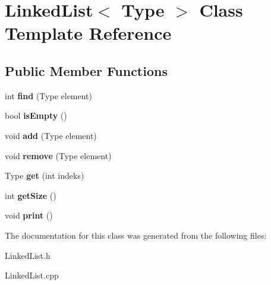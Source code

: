 \hypertarget{classLinkedList}{}\section{Linked\+List$<$ Type $>$ Class Template Reference}
\label{classLinkedList}
\subsection*{Public Member Functions}
\begin{DoxyCompactItemize}
\item 
\mbox{\label{classLinkedList_a28583dab40155730c7e83270b911317d}} 
int {\bfseries find} (Type element)
\item 
\mbox{\label{classLinkedList_a1164e950c11d424cc8a50f7419b3990e}} 
bool {\bfseries is\+Empty} ()
\item 
\mbox{\label{classLinkedList_aa138117192ac2a5bdb056092bcd1cd25}} 
void {\bfseries add} (Type element)
\item 
\mbox{\label{classLinkedList_a16c240dca90856ca78c51c61d7d5e7e1}} 
void {\bfseries remove} (Type element)
\item 
\mbox{\label{classLinkedList_a0362da1e1041e749c3d75dc3628186e9}} 
Type {\bfseries get} (int indeks)
\item 
\mbox{\label{classLinkedList_a2da81f9d412159a0d1a1c9e2ed3112a1}} 
int {\bfseries get\+Size} ()
\item 
\mbox{\label{classLinkedList_af8475b3b2da84ebd7c3af2358df825d2}} 
void {\bfseries print} ()
\end{DoxyCompactItemize}


The documentation for this class was generated from the following files\+:\begin{DoxyCompactItemize}
\item 
Linked\+List.\+h\item 
Linked\+List.\+cpp\end{DoxyCompactItemize}
